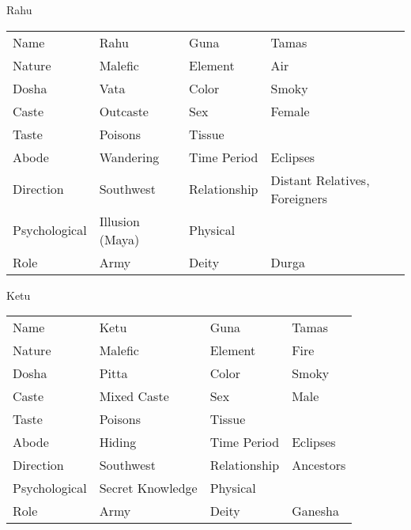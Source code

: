 Rahu
\begin{center}
\begin{tabular}{ l l l l}
Name	&Rahu	&Guna	&Tamas\\
Nature	&Malefic	&Element	&Air\\
Dosha	&Vata	&Color	&Smoky\\
Caste	&Outcaste	&Sex	&Female\\
Taste	&Poisons	&Tissue	\\
Abode	&Wandering	&Time Period	&Eclipses\\
Direction	&Southwest	&Relationship	&Distant Relatives, Foreigners\\
Psychological	&Illusion (Maya)	&Physical	&\\
Role	&Army	&Deity	&Durga\\
 \end{tabular}
\end{center}

Ketu
\begin{center}
\begin{tabular}{ l l l l}
Name	&Ketu	&Guna	&Tamas\\
Nature	&Malefic	&Element	&Fire\\
Dosha	&Pitta	&Color	&Smoky\\
Caste	&Mixed Caste	&Sex	&Male\\
Taste	&Poisons	&Tissue	\\
Abode	&Hiding	&Time Period	&Eclipses\\
Direction	&Southwest	&Relationship	&Ancestors\\
Psychological	&Secret Knowledge	&Physical	&\\
Role	&Army	  &Deity	&Ganesha\\
\end{tabular}
\end{center}